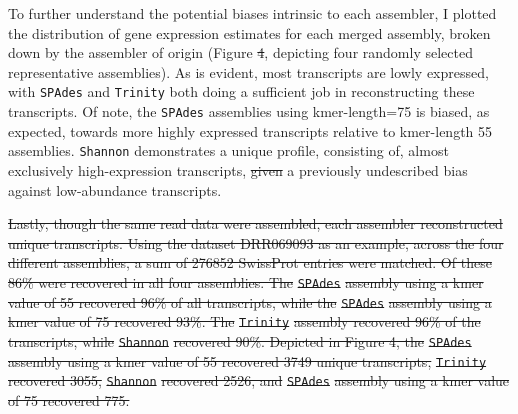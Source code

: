 \documentclass[10pt,letterpaper]{article}
\providecommand{\DIFaddtex}[1]{{\protect\color{blue}\uwave{#1}}} %
\providecommand{\DIFdeltex}[1]{{\protect\color{red}\sout{#1}}}                      %
\providecommand{\DIFaddbegin}{} %
\providecommand{\DIFaddend}{} %
\providecommand{\DIFdelbegin}{} %
\providecommand{\DIFdelend}{} %
\providecommand{\DIFadd}[1]{\texorpdfstring{\DIFaddtex{#1}}{#1}} %
\providecommand{\DIFdel}[1]{\texorpdfstring{\DIFdeltex{#1}}{}} %
\newcommand{\DIFscaledelfig}{0.5}
\newlength{\DIFdelgraphicswidth} %
\newlength{\DIFdelgraphicsheight} %
\newcommand{\DIFaddincludegraphics}[2][]{{\color{blue}\fbox{\DIFOincludegraphics[#1]{#2}}}} %
\newcommand{\DIFdelincludegraphics}[2][]{%
\sbox{\DIFdelgraphicsbox}{\DIFOincludegraphics[#1]{#2}}%
\settoboxwidth{\DIFdelgraphicswidth}{\DIFdelgraphicsbox} %
\settoboxtotalheight{\DIFdelgraphicsheight}{\DIFdelgraphicsbox} %
\scalebox{\DIFscaledelfig}{%
\parbox[b]{\DIFdelgraphicswidth}{\usebox{\DIFdelgraphicsbox}\\[-\baselineskip] \rule{\DIFdelgraphicswidth}{0em}}\llap{\resizebox{\DIFdelgraphicswidth}{\DIFdelgraphicsheight}{%
\setlength{\unitlength}{\DIFdelgraphicswidth}%
\begin{picture}(1,1)%
\thicklines\linethickness{2pt} %
{\color[rgb]{1,0,0}\put(0,0){\framebox(1,1){}}}%
{\color[rgb]{1,0,0}\put(0,0){\line( 1,1){1}}}%
{\color[rgb]{1,0,0}\put(0,1){\line(1,-1){1}}}%
\end{picture}%
}\hspace*{3pt}}} %
} %
\DeclareRobustCommand{\DIFaddbegin}{\DIFOaddbegin \let\includegraphics\DIFaddincludegraphics} %
\DeclareRobustCommand{\DIFaddend}{\DIFOaddend \let\includegraphics\DIFOincludegraphics} %
\DeclareRobustCommand{\DIFdelbegin}{\DIFOdelbegin \let\includegraphics\DIFdelincludegraphics} %
\DeclareRobustCommand{\DIFdelend}{\DIFOaddend \let\includegraphics\DIFOincludegraphics} %
\begin{document}
To further understand the potential biases intrinsic to each assembler, I plotted the distribution of gene expression estimates for each merged assembly, broken down by the assembler of origin (Figure \DIFdelbegin \DIFdel{4}\DIFdelend \DIFaddbegin \DIFadd{5}\DIFaddend , depicting four randomly selected representative assemblies). As is evident, most transcripts are lowly expressed, with \texttt{SPAdes} and \texttt{Trinity} both doing a sufficient job in reconstructing these transcripts. Of note, the \texttt{SPAdes} assemblies using kmer-length=75 is biased, as expected, towards more highly expressed transcripts relative to kmer-length 55 assemblies. \texttt{Shannon} demonstrates a unique profile, consisting of, almost exclusively high-expression transcripts, \DIFdelbegin \DIFdel{given }\DIFdelend \DIFaddbegin \DIFadd{showing }\DIFaddend a previously undescribed bias against low-abundance transcripts. \DIFdelbegin %

\textbf{%
} %

\DIFdel{Lastly, though the same read data were assembled, each assembler reconstructed unique transcripts. Using the dataset DRR069093 as an example, across the four different assemblies, a sum of 276852 SwissProt entries were matched. Of these 86\% were recovered in all four assemblies. The }\texttt{\DIFdel{SPAdes}} %
\DIFdel{assembly using a kmer value of 55 recovered 96\% of all transcripts, while the }\texttt{\DIFdel{SPAdes}} %
\DIFdel{assembly using a kmer value of 75 recovered 93\%. The }\texttt{\DIFdel{Trinity}} %
\DIFdel{assembly recovered 96\% of the transcripts, while }\texttt{\DIFdel{Shannon}} %
\DIFdel{recovered 90\%. Depicted in Figure 4, the }\texttt{\DIFdel{SPAdes}} %
\DIFdel{assembly using a kmer value of 55 recovered 3749 unique transcripts, }\texttt{\DIFdel{Trinity}} %
\DIFdel{recovered 3055, }\texttt{\DIFdel{Shannon}} %
\DIFdel{recovered 2526, and }\texttt{\DIFdel{SPAdes}} %
\DIFdel{assembly using a kmer value of 75 recovered 775. 
}%
\end{document}
